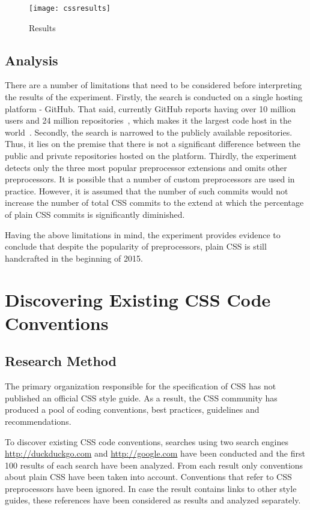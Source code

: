\documentclass[parskip=full]{uvamscse}
\begin{document}
\begin{figure}[h!]
  \centering
  \caption{Results}
  \texttt{[image: cssresults]}
\end{figure}

\section{Analysis}

There are a number of limitations that need to be considered before interpreting the results of the
experiment. Firstly, the search is conducted on a single hosting platform - GitHub. That said, currently
GitHub reports having over 10 million users and 24 million repositories~\cite{GitHub}, which makes
it the largest code host in the world~\cite{gousios2014lean}. Secondly, the search is narrowed to
the publicly available repositories. Thus, it lies on the premise that there is not a significant
difference between the public and private repositories hosted on the platform. Thirdly, the
experiment detects only the three most popular preprocessor extensions and omits other
preprocessors. It is possible that a number of custom preprocessors are used in practice. However,
it is assumed that the number of such commits would not increase the number of total CSS commits to
the extend at which the percentage of plain CSS commits is significantly diminished.

Having the above limitations in mind, the experiment provides evidence to conclude that despite the popularity of preprocessors, plain CSS is still handcrafted in the beginning of 2015.


\chapter{Discovering Existing CSS Code Conventions}

\section{Research Method}

The primary organization responsible for the specification of CSS has not published an official CSS
style guide. As a result, the CSS community has produced a pool of coding conventions, best
practices, guidelines and recommendations.

To discover existing CSS code conventions, searches using two search engines
\url{http://duckduckgo.com} and \url{http://google.com} have been conducted and the first 100
results of each search have been analyzed. From each result only conventions about plain CSS have
been taken into account. Conventions that refer to CSS preprocessors have been ignored. In case the
result contains links to other style guides, these references have been considered as results and
analyzed separately.
\end{document}
